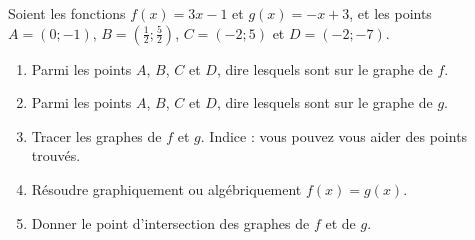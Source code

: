 
\begin{exercice}\label{exosmath-0016}

    Soient les fonctions \( f(x)=3x-1\) et \( g(x)=-x+3\), et les points \( A=(0;-1)\), \( B=(\frac{ 1 }{2};\frac{ 5 }{2})\), \( C=(-2;5)\) et \( D=(-2;-7)\).
    \begin{multicols}{2}
        \begin{enumerate}
            \item
                Parmi les points \( A\), \( B\), \( C\) et \( D\), dire lesquels sont sur le graphe de \( f\).
            \item
                Parmi les points \( A\), \( B\), \( C\) et \( D\), dire lesquels sont sur le graphe de \( g\).
            \item
                Tracer les graphes de \( f\) et \( g\). Indice : vous pouvez vous aider des points trouvés.
            \item
                Résoudre graphiquement ou algébriquement \( f(x)=g(x)\).
            \item
                Donner le point d'intersection des graphes de \( f\) et de \( g\).
        \end{enumerate}
    \end{multicols}

\end{exercice}
